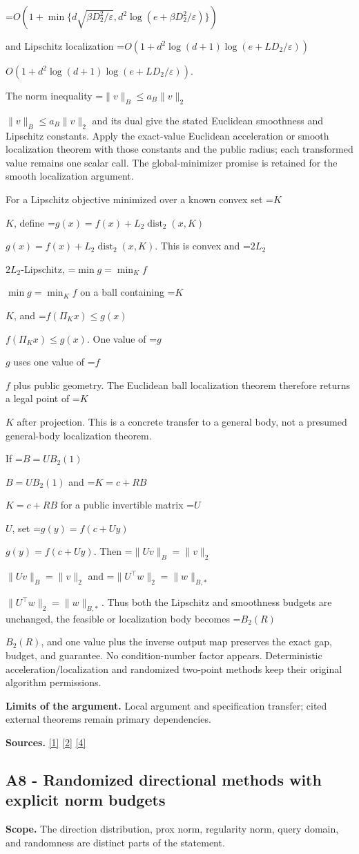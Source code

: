 \documentclass[10pt,a4paper]{article}
\newcommand{\AtlasMath}[1]{\par\begingroup\centering\setbox0=\hbox{$\displaystyle #1$}\ifdim\wd0>1.4\linewidth\typeout{ATLAS WIDE FORMULA: \the\wd0}\fi\ifdim\wd0>\linewidth\resizebox{\linewidth}{!}{\box0}\else\box0\fi\par\endgroup}
\newcommand{\AtlasInlineMath}[1]{\begingroup\setbox0=\hbox{$#1$}\ifdim\wd0>.4\linewidth\endgroup\AtlasMath{#1}\else\endgroup$#1$\fi}
\begin{document}
\AtlasMath{O\!\left(1+\min\{d\sqrt{\beta D_2^2/\varepsilon},d^2\log(e+\beta D_2^2/\varepsilon)\}\right)}

and Lipschitz localization \AtlasInlineMath{O(1+d^2\log(d+1)\log(e+LD_2/\varepsilon))}.

The norm inequality \AtlasInlineMath{\|v\|_B\le a_B\|v\|_2} and its dual give the stated Euclidean smoothness and Lipschitz constants. Apply the exact-value Euclidean acceleration or smooth localization theorem with those constants and the public radius; each transformed value remains one scalar call. The global-minimizer promise is retained for the smooth localization argument.

For a Lipschitz objective minimized over a known convex set \AtlasInlineMath{K}, define \AtlasInlineMath{g(x)=f(x)+L_2\operatorname{dist}_2(x,K)}. This is convex and \AtlasInlineMath{2L_2}-Lipschitz, \AtlasInlineMath{\min g=\min_K f} on a ball containing \AtlasInlineMath{K}, and \AtlasInlineMath{f(\Pi_Kx)\le g(x)}. One value of \AtlasInlineMath{g} uses one value of \AtlasInlineMath{f} plus public geometry. The Euclidean ball localization theorem therefore returns a legal point of \AtlasInlineMath{K} after projection. This is a concrete transfer to a general body, not a presumed general-body localization theorem.

If \AtlasInlineMath{B=UB_2(1)} and \AtlasInlineMath{K=c+RB} for a public invertible matrix \AtlasInlineMath{U}, set \AtlasInlineMath{g(y)=f(c+Uy)}. Then \AtlasInlineMath{\|Uv\|_B=\|v\|_2} and \AtlasInlineMath{\|U^\top w\|_2=\|w\|_{B,*}}. Thus both the Lipschitz and smoothness budgets are unchanged, the feasible or localization body becomes \AtlasInlineMath{B_2(R)}, and one value plus the inverse output map preserves the exact gap, budget, and guarantee. No condition-number factor appears. Deterministic acceleration/localization and randomized two-point methods keep their original algorithm permissions.

\textbf{Limits of the argument.} Local argument and specification transfer; cited external theorems remain primary dependencies.

\textbf{Sources.} \href{https://arxiv.org/html/2610.00345v1}{[1]} \href{https://arxiv.org/html/2607.16558v2}{[2]} \href{https://www.mathnet.ru/php/archive.phtml?jrnid=mzm&option_lang=eng&paperid=1697&wshow=paper}{[4]}

\subsection{A8 - Randomized directional methods with explicit norm budgets}
\textbf{Scope.} The direction distribution, prox norm, regularity norm, query domain, and randomness are distinct parts of the statement.
\end{document}
